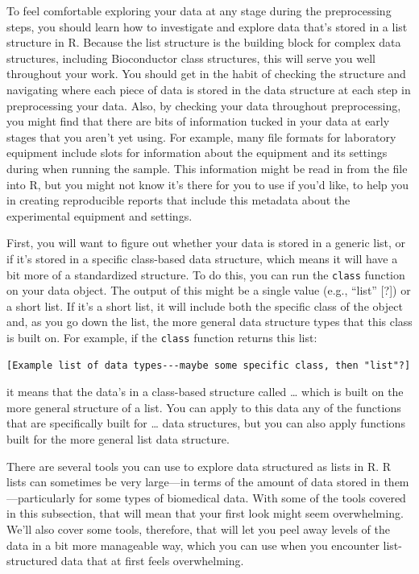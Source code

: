 \documentclass[]{tufte-book}
\begin{document}
To feel comfortable exploring your data at any stage during the preprocessing
steps, you should learn how to investigate and explore data that's stored
in a list structure in R. Because the list structure is the building block
for complex data structures, including Bioconductor class structures, this will
serve you well throughout your work. You should get in the habit of checking
the structure and navigating where each piece of data is stored in the data
structure at each step in preprocessing your data. Also, by checking your data
throughout preprocessing, you might find that there are bits of information
tucked in your data at early stages that you aren't yet using. For example,
many file formats for laboratory equipment include slots for information about
the equipment and its settings during when running the sample. This information
might be read in from the file into R, but you might not know it's there for you
to use if you'd like, to help you in creating reproducible reports that include
this metadata about the experimental equipment and settings.

First, you will want to figure out whether your data is stored in a generic
list, or if it's stored in a specific class-based data structure, which means it
will have a bit more of a standardized structure. To do this, you can run the
\texttt{class} function on your data object. The output of this might be a single value
(e.g., ``list'' {[}?{]}) or a short list. If it's a short list, it will include both
the specific class of the object and, as you go down the list, the more
general data structure types that this class is built on. For example, if the
\texttt{class} function returns this list:

\begin{verbatim}
[Example list of data types---maybe some specific class, then "list"?]
\end{verbatim}

it means that the data's in a class-based structure called \ldots{} which is built on
the more general structure of a list. You can apply to this data any of the functions
that are specifically built for \ldots{} data structures, but you can also apply
functions built for the more general list data structure.

There are several tools you can use to explore data structured as lists in R.
R lists can sometimes be very large---in terms of the amount of data stored in
them---particularly for some types of biomedical data. With some of the tools
covered in this subsection, that will mean that your first look might seem
overwhelming. We'll also cover some tools, therefore, that will let you peel
away levels of the data in a bit more manageable way, which you can use when
you encounter list-structured data that at first feels overwhelming.
\end{document}
